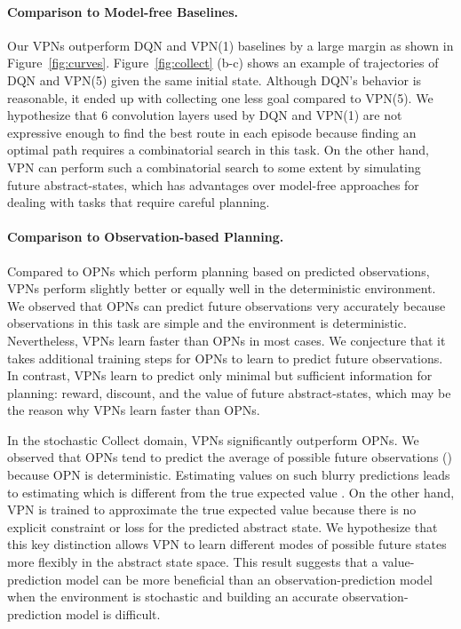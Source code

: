 \documentclass{article}
\newcommand{\obsmodel}{{observation-prediction model}}
\newcommand{\valuemodel}{{value-prediction model}}
\newcommand{\cutparagraphup}{\vspace{-2pt}}
\begin{document}
\cutparagraphup
\paragraph{Comparison to Model-free Baselines.} 
Our VPNs outperform DQN and VPN(1) baselines by a large margin as shown in Figure~\ref{fig:curves}. Figure~\ref{fig:collect} (b-c) shows an example of trajectories of DQN and VPN(5) given the same initial state. Although DQN's behavior is reasonable, it ended up with collecting one less goal compared to VPN(5).
We hypothesize that 6 convolution layers used by DQN and VPN(1) are not expressive enough to find the best route in each episode because finding an optimal path requires a combinatorial search in this task. On the other hand, VPN can perform such a combinatorial search to some extent by simulating future abstract-states, which has advantages over model-free approaches for dealing with tasks that require careful planning.

\cutparagraphup
\paragraph{Comparison to Observation-based Planning.}
Compared to OPNs which perform planning based on predicted observations, VPNs perform slightly better or equally well in the deterministic environment. We observed that OPNs can predict future observations very accurately because observations in this task are simple and the environment is deterministic. Nevertheless, VPNs learn faster than OPNs in most cases. We conjecture that it takes additional training steps for OPNs to learn to predict future observations. In contrast, VPNs learn to predict only minimal but sufficient information for planning: reward, discount, and the value of future abstract-states, which may be the reason why VPNs learn faster than OPNs.

In the stochastic Collect domain, VPNs significantly outperform OPNs. We observed that OPNs tend to predict the average of possible future observations () because OPN is deterministic. Estimating values on such blurry predictions leads to estimating  which is different from the true expected value . On the other hand, VPN is trained to approximate the true expected value because there is no explicit constraint or loss for the predicted abstract state. We hypothesize that this key distinction allows VPN to learn different modes of possible future states more flexibly in the abstract state space.
This result suggests that a \valuemodel{} can be more beneficial than an \obsmodel{} when the environment is stochastic and building an accurate \obsmodel{} is difficult.
\end{document}
